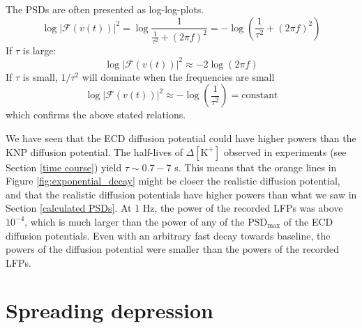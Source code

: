 \documentclass{uiophd}
\begin{document}
The PSDs are often presented as log-log-plots.
$$
\log |\mathcal{F}(v(t))|^2= \log \frac{1}{\frac{1}{\tau^2} +(2\pi f)^2}=- \log(\frac{1}{\tau^2} +(2\pi f)^2)
$$
If $\tau$ is large:
$$
\log |\mathcal{F}(v(t))|^2 \approx -2\log(2\pi f)
$$
If $\tau$ is small, $1/\tau^2$ will dominate when the frequencies are small
$$
\log |\mathcal{F}(v(t))|^2 \approx -\log(\frac{1}{\tau^2})=\text{constant}
$$
which confirms the above stated relations. 

We have seen that the ECD diffusion potential could have higher powers than the KNP diffusion potential. The half-lives of $\Delta [\text{K}^+]$ observed in experiments (see Section \ref{time course}) yield $\tau \sim 0.7-7$ s. This means that the orange lines in Figure \ref{fig:exponential_decay} might be closer the realistic diffusion potential, and that the realistic diffusion potentials have higher powers than what we saw in Section \ref{calculated PSDs}.  At 1 Hz, the power of the recorded LFPs \cite{Gratiy2017}\cite{Baranauskas2011}\cite{Jankowski2017} was above $10^{-4}$, which is much larger than the power of any of the $\text{PSD}_{\text{max}}$ of the ECD diffusion potentials. Even with an arbitrary fast decay towards baseline, the powers of the diffusion potential were smaller than the powers of the recorded LFPs.

\section{Spreading depression}\label{SD simulated}
\end{document}
